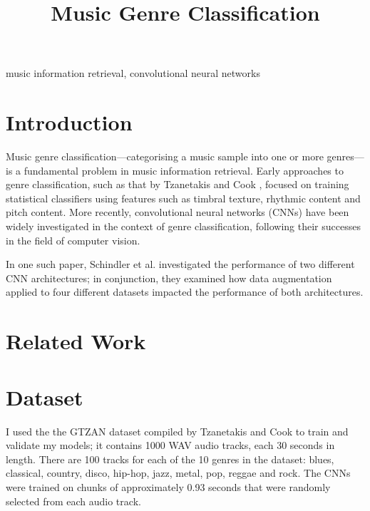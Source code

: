 \documentclass[conference]{IEEEtran}
\begin{document}
\title{Music Genre Classification}

\author{
}

\maketitle

\begin{abstract}
\end{abstract}

\begin{IEEEkeywords}
music information retrieval, convolutional neural networks
\end{IEEEkeywords}

\section{Introduction}

Music genre classification---categorising a music sample into one or more genres---is a fundamental problem in music information retrieval.
Early approaches to genre classification, such as that by Tzanetakis and Cook \cite{TzanetakisCook}, focused on training statistical classifiers using features such as timbral texture, rhythmic content and pitch content.
More recently, convolutional neural networks (CNNs) have been widely investigated in the context of genre classification, following their successes in the field of computer vision.

In one such paper, Schindler et al. \cite{SchindlerLidyRauber} investigated the performance of two different CNN architectures; in conjunction, they examined how data augmentation applied to four different datasets impacted the performance of both architectures.

\section{Related Work}

\section{Dataset}

I used the the GTZAN dataset compiled by Tzanetakis and Cook \cite{TzanetakisCook} to train and validate my models; it contains 1000 WAV audio tracks, each 30 seconds in length.
There are 100 tracks for each of the 10 genres in the dataset: blues, classical, country, disco, hip-hop, jazz, metal, pop, reggae and rock.
The CNNs were trained on chunks of approximately 0.93 seconds that were randomly selected from each audio track.
\end{document}
